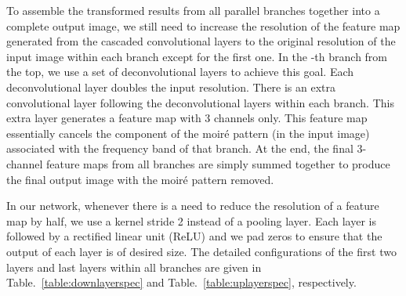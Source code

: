 \documentclass[journal]{IEEEtran}
\begin{document}
To assemble the transformed results from all parallel branches together into a complete output image, we still need to increase the resolution of the feature map generated from the cascaded convolutional layers to the original resolution of the input image within each branch except for the first one. In the -th branch from the top, we use a set of  deconvolutional layers to achieve this goal. Each deconvolutional layer doubles the input resolution. There is an extra convolutional layer following the deconvolutional layers within each branch. This extra layer generates a feature map with 3 channels only. This feature map essentially cancels the component of the moir\'{e} pattern (in the input image) associated with the frequency band of that branch. At the end, the final 3-channel feature maps from all branches are simply summed together to produce the final output image with the moir\'{e} pattern removed.

In our network, whenever there is a need to reduce the resolution of a feature map by half, we use a kernel stride 2 instead of a pooling layer. Each layer is followed by a rectified linear unit (ReLU) and we pad zeros to ensure that the output of each layer is of desired size. The detailed configurations of the first two layers and last layers within all branches are given in Table.~\ref{table:downlayerspec} and Table.~\ref{table:uplayerspec}, respectively.
\end{document}
